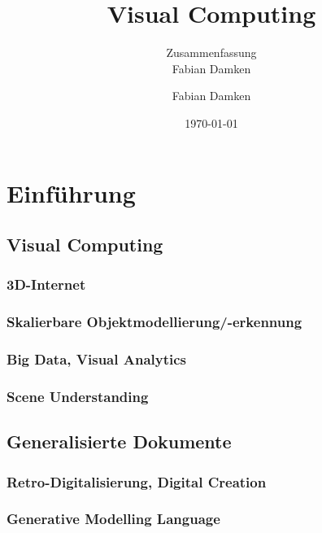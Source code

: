 \documentclass[a4paper, 11pt, accentcolor = tud3b]{tudreport}
\title{Visual Computing}
\subtitle{Zusammenfassung \\ Fabian Damken}
\author{Fabian Damken}
\date{\today}
\begin{document}
	\maketitle
	\tableofcontents
	\listoftodos

	\chapter{Einführung} %

		\section{Visual Computing} %

			\subsection{3D-Internet} %

			\subsection{Skalierbare Objektmodellierung/-erkennung} %

			\subsection{Big Data, Visual Analytics} %

			\subsection{Scene Understanding} %

		\section{Generalisierte Dokumente} %

			\subsection{Retro-Digitalisierung, Digital Creation} %

			\subsection{Generative Modelling Language} %
\end{document}
